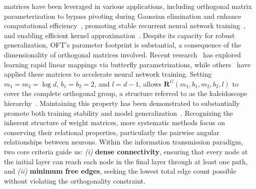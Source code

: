 \begin{itemize}[leftmargin=*,nosep]
matrices have been leveraged in various applications, including orthogonal matrix parameterization to bypass pivoting during Gaussian elimination and enhance computational efficiency~\cite{parker1995random}, promoting stable recurrent neural network training~\cite{jing2017tunable}, and enabling efficient kernel approximation~\cite{munkhoeva2018quadrature}. Despite its capacity for robust generalization, OFT’s parameter footprint is substantial, a consequence of the dimensionality of orthogonal matrices involved. Recent research~\cite{dao2019learning,dao2019kaleidoscope} has explored learning rapid linear mappings via butterfly parametrizations, while others~\cite{chen2022pixelated,dao2022monarch} have applied these matrices to accelerate neural network training. Setting $m_1=m_2=\log d$, $b_1=b_2=2$, and $l=d-1$, allows $\bm{R}^G(m_1,b_1,m_2,b_2,l)$ to cover the complete orthogonal group, a structure referred to as the kaleidoscope hierarchy~\cite{dao2019kaleidoscope}. Maintaining this property has been demonstrated to substantially promote both training stability and model generalization~\cite{miyato2018spectral,yoshida2017spectral}. Recognizing the inherent structure of weight matrices, more systematic methods focus on conserving their relational properties, particularly the pairwise angular relationships between neurons. Within the information transmission paradigm, two core criteria guide us: \emph{(i)} \textbf{dense connectivity}, ensuring that every node at the initial layer can reach each node in the final layer through at least one path, and \emph{(ii)} \textbf{minimum free edges}, seeking the lowest total edge count possible without violating the orthogonality constraint. \begin{theorem}\label{thm:exp_boft}

\end{theorem}
\end{itemize}
